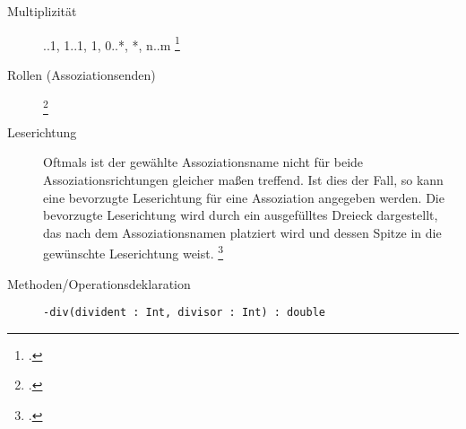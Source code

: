 \documentclass{lehramt-informatik-haupt}
\begin{document}
\begin{description}
\begin{center}
\end{center}

%

\item[Multiplizität]
..1, 1..1, 1, 0..*, *, n..m
\footcite[Seite 98 (PDF 115)]{uml}

%

\item[Rollen (Assoziationsenden)]
\footcite[Seite 145]{rupp}

\begin{center}
\end{center}

\item[Leserichtung]

Oftmals ist der gewählte Assoziationsname nicht für beide
Assoziationsrichtungen gleicher­ maßen treffend. Ist dies der Fall, so
kann eine bevorzugte Leserichtung für eine Assoziation angegeben werden.
Die bevorzugte Leserichtung wird durch ein ausgefülltes Dreieck
darge­stellt, das nach dem Assoziationsnamen platziert wird und dessen
Spitze in die gewünschte Leserichtung weist.
\footcite[Seite 144]{rupp}

\begin{center}
\end{center}

%

\item[Methoden/Operationsdeklaration]
\zB \verb|-div(divident : Int, divisor : Int) : double|

%


\end{description}
\end{document}

